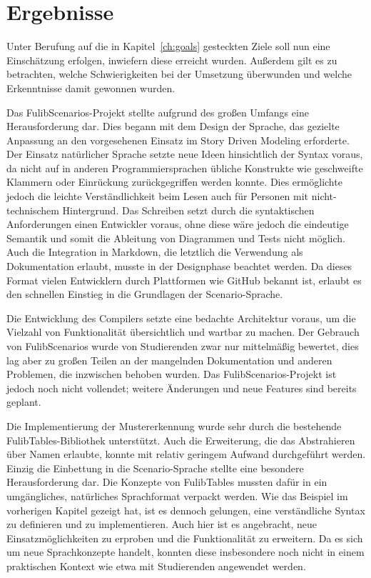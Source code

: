 \chapter{Ergebnisse}\label{ch:ergebnisse}

Unter Berufung auf die in Kapitel~\ref{ch:goals} gesteckten Ziele soll nun eine Einschätzung erfolgen, inwiefern diese erreicht wurden.
Außerdem gilt es zu betrachten, welche Schwierigkeiten bei der Umsetzung überwunden und welche Erkenntnisse damit gewonnen wurden.

Das FulibScenarios-Projekt stellte aufgrund des großen Umfangs eine Herausforderung dar.
Dies begann mit dem Design der Sprache, das gezielte Anpassung an den vorgesehenen Einsatz im Story Driven Modeling erforderte.
Der Einsatz natürlicher Sprache setzte neue Ideen hinsichtlich der Syntax voraus, da nicht auf in anderen Programmiersprachen übliche Konstrukte wie geschweifte Klammern oder Einrückung zurückgegriffen werden konnte.
Dies ermöglichte jedoch die leichte Verständlichkeit beim Lesen auch für Personen mit nicht-technischem Hintergrund.
Das Schreiben setzt durch die syntaktischen Anforderungen einen Entwickler voraus, ohne diese wäre jedoch die eindeutige Semantik und somit die Ableitung von Diagrammen und Tests nicht möglich.
Auch die Integration in Markdown, die letztlich die Verwendung als Dokumentation erlaubt, musste in der Designphase beachtet werden.
Da dieses Format vielen Entwicklern durch Plattformen wie GitHub bekannt ist, erlaubt es den schnellen Einstieg in die Grundlagen der Scenario-Sprache.

Die Entwicklung des Compilers setzte eine bedachte Architektur voraus, um die Vielzahl von Funktionalität übersichtlich und wartbar zu machen.
Der Gebrauch von FulibScenarios wurde von Studierenden zwar nur mittelmäßig bewertet,
dies lag aber zu großen Teilen an der mangelnden Dokumentation und anderen Problemen, die inzwischen behoben wurden.
Das FulibScenarios-Projekt ist jedoch noch nicht vollendet;
weitere Änderungen und neue Features sind bereits geplant.

Die Implementierung der Mustererkennung wurde sehr durch die bestehende FulibTables-Bibliothek unterstützt.
Auch die Erweiterung, die das Abstrahieren über Namen erlaubte, konnte mit relativ geringem Aufwand durchgeführt werden.
Einzig die Einbettung in die Scenario-Sprache stellte eine besondere Herausforderung dar.
Die Konzepte von FulibTables mussten dafür in ein umgängliches, natürliches Sprachformat verpackt werden.
Wie das Beispiel im vorherigen Kapitel gezeigt hat, ist es dennoch gelungen, eine verständliche Syntax zu definieren und zu implementieren.
Auch hier ist es angebracht, neue Einsatzmöglichkeiten zu erproben und die Funktionalität zu erweitern.
Da es sich um neue Sprachkonzepte handelt, konnten diese insbesondere noch nicht in einem praktischen Kontext wie etwa mit Studierenden angewendet werden.

